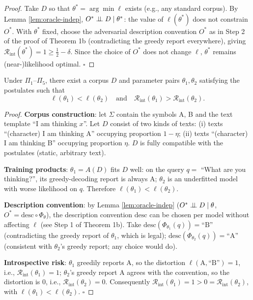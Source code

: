 \begin{proof}
Take $D$ so that $\theta^{*} = \arg\min \ell$ exists (e.g., any standard corpus). By Lemma
\ref{lem:oracle-indep}, $O^{*} \perp\!\!\!\perp D \mid \theta^{*}$: the value of $\ell(\theta^{*})$
does not constrain $O^{*}$. With $\theta^{*}$ fixed, choose the adversarial description
convention $O^{*}$ as in Step 2 of the proof of Theorem 1b (contradicting the greedy report
everywhere), giving $\mathcal{R}_{\mathrm{int}}(\theta^{*}) = 1 \ge \tfrac12 - \delta$.
Since the choice of $O^{*}$ does not change $\ell$, $\theta^{*}$ remains (near-)likelihood
optimal. $\square$
\end{proof}

\begin{restate}
Under $\Pi_1$--$\Pi_5$, there exist a corpus $D$ and parameter pairs $\theta_1, \theta_2$
satisfying the postulates such that
\begin{equation}
\ell(\theta_1) < \ell(\theta_2) \quad\text{and}\quad
\mathcal{R}_{\mathrm{int}}(\theta_1) > \mathcal{R}_{\mathrm{int}}(\theta_2) .
\label{eq:a-thm2b}
\end{equation}
\end{restate}

\begin{proof}
\textbf{Corpus construction}: let $\Sigma$ contain the symbols A, B and the text template
``I am thinking $x$''. Let $D$ consist of two kinds of texts: (i) texts ``(character) I am
thinking A'' occupying proportion $1-\eta$; (ii) texts ``(character) I am thinking B''
occupying proportion $\eta$. $D$ is fully compatible with the postulates (static, arbitrary
text).

\textbf{Training products}: $\theta_1 = A(D)$ fits $D$ well: on the query $q =$ ``What are
you thinking?'', its greedy-decoding report is always A; $\theta_2$ is an underfitted model
with worse likelihood on $q$. Therefore $\ell(\theta_1) < \ell(\theta_2)$.

\textbf{Description convention}: by Lemma \ref{lem:oracle-indep} ($O^{*} \perp\!\!\!\perp D \mid
\theta$, $O^{*} = \mathrm{desc} \circ \Phi_\theta$), the description convention
$\mathrm{desc}$ can be chosen per model without affecting $\ell$ (see Step 1 of Theorem 1b).
Take $\mathrm{desc}(\Phi_{\theta_1}(q)) = \text{``B''}$ (contradicting the greedy report of
$\theta_1$, which is legal); $\mathrm{desc}(\Phi_{\theta_2}(q)) = \text{``A''}$ (consistent with
$\theta_2$'s greedy report; any choice would do).

\textbf{Introspective risk}: $\theta_1$ greedily reports A, so the distortion
$\ell(\text{A}, \text{``B''}) = 1$, i.e., $\mathcal{R}_{\mathrm{int}}(\theta_1) = 1$;
$\theta_2$'s greedy report A agrees with the convention, so the distortion is $0$, i.e.,
$\mathcal{R}_{\mathrm{int}}(\theta_2) = 0$. Consequently
$\mathcal{R}_{\mathrm{int}}(\theta_1) = 1 > 0 = \mathcal{R}_{\mathrm{int}}(\theta_2)$,
with $\ell(\theta_1) < \ell(\theta_2)$. $\square$
\end{proof}

